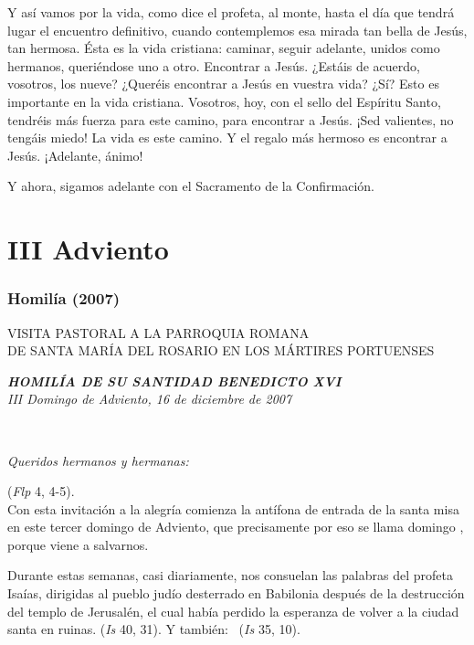 Y así vamos por la vida, como dice el profeta, al monte, hasta el día que tendrá lugar el encuentro definitivo, cuando contemplemos esa mirada tan bella de Jesús, tan hermosa. Ésta es la vida cristiana: caminar, seguir adelante, unidos como hermanos, queriéndose uno a otro. Encontrar a Jesús. ¿Estáis de acuerdo, vosotros, los nueve? ¿Queréis encontrar a Jesús en vuestra vida? ¿Sí? Esto es importante en la vida cristiana. Vosotros, hoy, con el sello del Espíritu Santo, tendréis más fuerza para este camino, para encontrar a Jesús. ¡Sed valientes, no tengáis miedo! La vida es este camino. Y el regalo más hermoso es encontrar a Jesús. ¡Adelante, ánimo!

Y ahora, sigamos adelante con el Sacramento de la Confirmación.

\section{III Adviento} \subsubsection{Homilía (2007)} VISITA PASTORAL A LA PARROQUIA ROMANA\\ DE SANTA MARÍA DEL ROSARIO EN LOS MÁRTIRES PORTUENSES

\emph{\textbf{HOMILÍA DE SU SANTIDAD BENEDICTO XVI}\\[2\baselineskip]III Domingo de Adviento, 16 de diciembre de 2007}

~

\emph{Queridos hermanos y hermanas:}

 (\emph{Flp} 4, 4-5).\\ Con esta invitación a la alegría comienza la antífona de entrada de la santa misa en este tercer domingo de Adviento, que precisamente por eso se llama domingo , porque viene a salvarnos.

Durante estas semanas, casi diariamente, nos consuelan las palabras del profeta Isaías, dirigidas al pueblo judío desterrado en Babilonia después de la destrucción del templo de Jerusalén, el cual había perdido la esperanza de volver a la ciudad santa en ruinas.  (\emph{Is} 40, 31). Y también:~  (\emph{Is} 35, 10).

